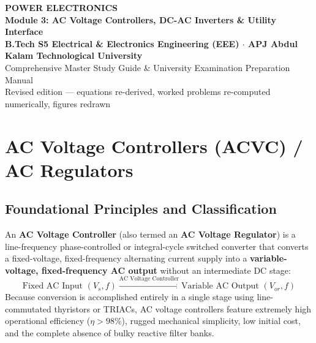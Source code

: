 \documentclass[11pt,a4paper]{article}
\let\origsection\section
\renewcommand{\section}{\Needspace{12\baselineskip}\origsection}
\let\origsubsection\subsection
\renewcommand{\subsection}{\Needspace{7\baselineskip}\origsubsection}
\begin{document}
\begin{center}
  {\LARGE\bfseries\color{navyprimary}POWER ELECTRONICS}\\[2mm]
  {\Large\bfseries\color{accentblue}Module 3: AC Voltage Controllers, DC-AC Inverters \& Utility Interface}\\[3mm]
  {\normalsize\bfseries B.Tech S5 Electrical \& Electronics Engineering (EEE) $\cdot$ APJ Abdul Kalam Technological University}\\[1mm]
  {\small\color{gray}Comprehensive Master Study Guide \& University Examination Preparation Manual}\\[1mm]
  {\footnotesize\color{gray}Revised edition --- equations re-derived, worked problems re-computed numerically, figures redrawn}\\[2mm]
  \noindent\makebox[\linewidth]{\color{navyprimary}\rule{\linewidth}{1.5pt}}
\end{center}

\vspace{-2mm}
\tableofcontents
\vspace{4mm}
\noindent\makebox[\linewidth]{\color{cardborder}\rule{\linewidth}{0.6pt}}
\vspace{2mm}

\section{AC Voltage Controllers (ACVC) / AC Regulators}

\subsection{Foundational Principles and Classification}

An \textbf{AC Voltage Controller} (also termed an \textbf{AC Voltage Regulator}) is a line-frequency phase-controlled or integral-cycle switched converter that converts a fixed-voltage, fixed-frequency alternating current supply into a \textbf{variable-voltage, fixed-frequency AC output} without an intermediate DC stage:
\begin{equation}
\text{Fixed AC Input } (V_s, f) \xrightarrow{\text{AC Voltage Controller}} \text{Variable AC Output } (V_{or}, f)
\end{equation}
Because conversion is accomplished entirely in a single stage using line-commutated thyristors or TRIACs, AC voltage controllers feature extremely high operational efficiency ($\eta > 98\%$), rugged mechanical simplicity, low initial cost, and the complete absence of bulky reactive filter banks.
\end{document}
